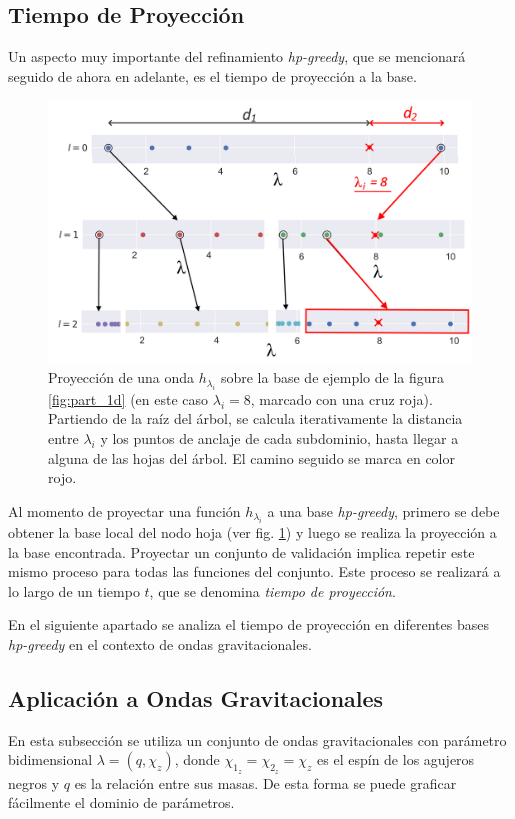 \subsection{Tiempo de Proyección}


Un aspecto muy importante del refinamiento \textit{hp-greedy}, que se mencionará seguido de ahora en adelante, es el tiempo de proyección a la base. 


\begin{figure}[h!]
\centering
\includegraphics[width=0.75\columnwidth]{figs/proyeccion_1d.png}
\caption{Proyección de una onda $h_{\lambda_i}$ sobre la base de ejemplo de la figura \ref{fig:part_1d} (en este caso $\lambda_i = 8$, marcado con una cruz roja). Partiendo de la raíz del árbol, se calcula iterativamente la distancia entre $\lambda_i$ y los puntos de anclaje de cada subdominio, hasta llegar a alguna de las hojas del árbol. El camino seguido se marca en color rojo.}
\label{fig:proy_1d}
\end{figure}

Al momento de proyectar una función $h_{\lambda_i}$ a una base \textit{hp-greedy}, primero se debe obtener la base local del nodo hoja (ver fig. \ref{fig:proy_1d}) y luego se realiza la proyección a la base encontrada.
Proyectar un conjunto de validación implica repetir este mismo proceso para todas las funciones del conjunto. Este proceso se realizará a lo largo de un tiempo $t$, que se denomina \textit{tiempo de proyección}. 

En el siguiente apartado se analiza el tiempo de proyección en diferentes bases \textit{hp-greedy} en el contexto de ondas gravitacionales.


\subsection{Aplicación a Ondas Gravitacionales}
\label{sec:hp-gw}

En esta subsección se utiliza un conjunto de ondas gravitacionales con parámetro bidimensional $\lambda = (q, \chi_z)$, donde $\chi_{1_z} = \chi_{2_z} = \chi_z$ es el espín de los agujeros negros y $q$ es la relación entre sus masas. De esta forma se puede graficar fácilmente el dominio de parámetros.



